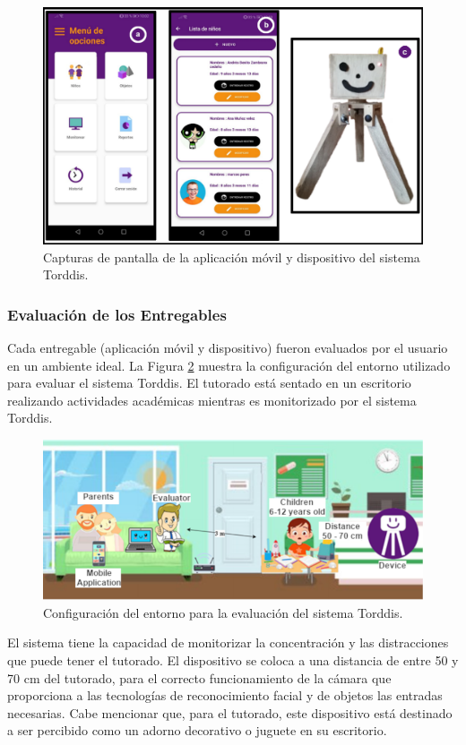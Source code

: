 \begin{figure}[h]
\centering
\includegraphics[width=\linewidth]{figs/Figure_9}
\caption{Capturas de pantalla de la aplicación móvil y dispositivo del sistema Torddis.\label{fig:TorddisApp}} 
\end{figure}

\subsubsection{Evaluación de los Entregables}
Cada entregable (aplicación móvil y dispositivo) fueron evaluados por el usuario en un ambiente ideal.
La Figura \ref{fig:ConfigEvaluation} muestra la configuración del entorno utilizado para evaluar el sistema Torddis. El tutorado está sentado en un escritorio realizando actividades académicas mientras es monitorizado por el sistema Torddis.

\begin{figure}[h]
\centering
\includegraphics[width=\linewidth]{figs/Figure_10}
\caption{Configuración del entorno para la evaluación del sistema Torddis. \label{fig:ConfigEvaluation}} 
\end{figure}

El sistema tiene la capacidad de monitorizar la concentración y las distracciones que puede tener el tutorado. El dispositivo se coloca a una distancia de entre 50 y 70 cm del tutorado, para el correcto funcionamiento de la cámara que proporciona a las tecnologías de reconocimiento facial y de objetos las entradas necesarias. Cabe mencionar que, para el tutorado, este dispositivo está destinado a ser percibido como un adorno decorativo o juguete en su escritorio.

